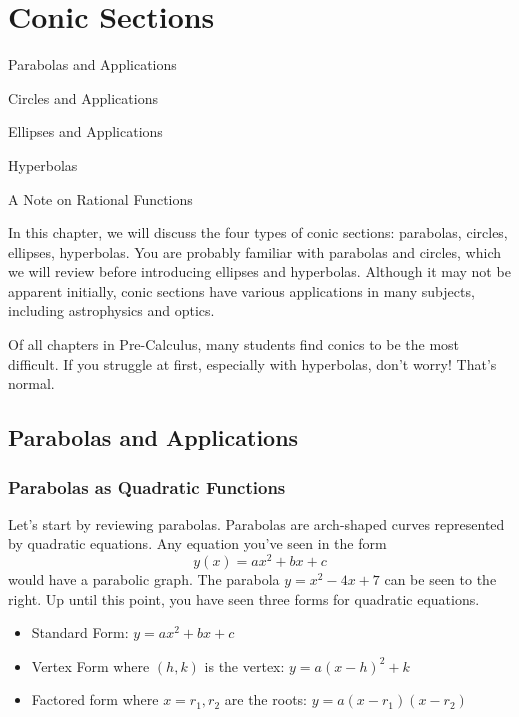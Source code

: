 \documentclass[lang=en,11pt]{elegantbook}
\begin{document}
\chapter{Conic Sections}
\begin{introduction}[Contents]
\item Parabolas and Applications
\item Circles and Applications
\item Ellipses and Applications
\item Hyperbolas
\item A Note on Rational Functions
\end{introduction}

\noindent In this chapter, we will discuss the four types of conic sections: parabolas, circles, ellipses, hyperbolas.  You are probably familiar with parabolas and circles, which we will review before introducing ellipses and hyperbolas.  Although it may not be apparent initially, conic sections have various applications in many subjects, including astrophysics and optics.  

\begin{remark} 
Of all chapters in Pre-Calculus, many students find conics to be the most difficult.  If you struggle at first, especially with hyperbolas, don't worry!  That's normal.
\end{remark}

\section{Parabolas and Applications}
\subsection{Parabolas as Quadratic Functions}
\noindent Let's start by reviewing parabolas.  Parabolas are arch-shaped curves represented by quadratic equations.  Any equation you've seen in the form $$y(x) = ax^2+bx+c$$
would have a parabolic graph.  The parabola $y=x^2-4x+7$ can be seen to the right.  Up until this point, you have seen three forms for quadratic equations.

\begin{itemize}
    \item Standard Form: $y = ax^2+bx+c$
    \item Vertex Form where $(h,k)$ is the vertex: $y = a(x-h)^2+k $
    \item Factored form where $x=r_1,r_2$ are the roots: $y = a(x-r_1)(x-r_2) $
\end{itemize}
\end{document}
